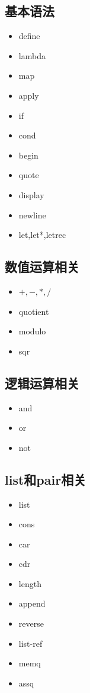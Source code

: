 \documentclass[11pt, a4paper]{article}
\begin{document}
		\subsection{基本语法}
			\begin{itemize}
				\item define
				\item lambda
				\item map
				\item apply
				\item if
				\item cond
				\item begin
				\item quote
				\item display
				\item newline
				\item let,let*,letrec
			\end{itemize}
		\subsection{数值运算相关}
			\begin{itemize}
				\item $+,-,*,/$
				\item quotient
				\item modulo
				\item sqr
			\end{itemize}
		\subsection{逻辑运算相关}
			\begin{itemize}
				\item and
				\item or
				\item not
			\end{itemize}
		\subsection{list和pair相关}
			\begin{itemize}
				\item list
				\item cons
				\item car
				\item cdr
				\item length
				\item append
				\item reverse
				\item list-ref
				\item memq
				\item assq
			\end{itemize}
\end{document}
